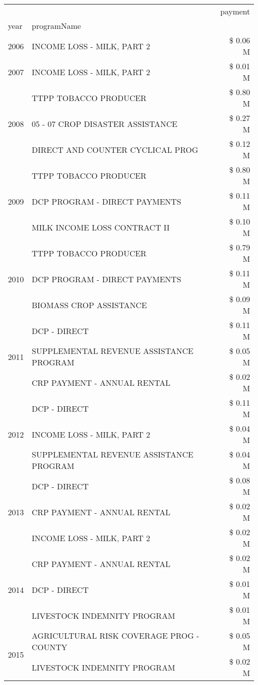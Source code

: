 \begin{tabular}{llr}
\toprule
 &  & payment \\
year & programName &  \\
\midrule
2006 & INCOME LOSS - MILK, PART 2 & \$ 0.06 M \\
\cline{1-3}
2007 & INCOME LOSS - MILK, PART 2 & \$ 0.01 M \\
\cline{1-3}
\multirow[t]{3}{*}{2008} & TTPP TOBACCO PRODUCER & \$ 0.80 M \\
 & 05 - 07 CROP DISASTER ASSISTANCE & \$ 0.27 M \\
 & DIRECT AND COUNTER CYCLICAL PROG & \$ 0.12 M \\
\cline{1-3}
\multirow[t]{3}{*}{2009} & TTPP TOBACCO PRODUCER & \$ 0.80 M \\
 & DCP PROGRAM - DIRECT PAYMENTS & \$ 0.11 M \\
 & MILK INCOME LOSS CONTRACT II & \$ 0.10 M \\
\cline{1-3}
\multirow[t]{3}{*}{2010} & TTPP TOBACCO PRODUCER & \$ 0.79 M \\
 & DCP PROGRAM - DIRECT PAYMENTS & \$ 0.11 M \\
 & BIOMASS CROP ASSISTANCE & \$ 0.09 M \\
\cline{1-3}
\multirow[t]{3}{*}{2011} & DCP - DIRECT & \$ 0.11 M \\
 & SUPPLEMENTAL REVENUE ASSISTANCE PROGRAM & \$ 0.05 M \\
 & CRP PAYMENT - ANNUAL RENTAL & \$ 0.02 M \\
\cline{1-3}
\multirow[t]{3}{*}{2012} & DCP - DIRECT & \$ 0.11 M \\
 & INCOME LOSS - MILK, PART 2 & \$ 0.04 M \\
 & SUPPLEMENTAL REVENUE ASSISTANCE PROGRAM & \$ 0.04 M \\
\cline{1-3}
\multirow[t]{3}{*}{2013} & DCP - DIRECT & \$ 0.08 M \\
 & CRP PAYMENT - ANNUAL RENTAL & \$ 0.02 M \\
 & INCOME LOSS - MILK, PART 2 & \$ 0.02 M \\
\cline{1-3}
\multirow[t]{3}{*}{2014} & CRP PAYMENT - ANNUAL RENTAL & \$ 0.02 M \\
 & DCP - DIRECT & \$ 0.01 M \\
 & LIVESTOCK INDEMNITY PROGRAM & \$ 0.01 M \\
\cline{1-3}
\multirow[t]{3}{*}{2015} & AGRICULTURAL RISK COVERAGE PROG - COUNTY & \$ 0.05 M \\
 & LIVESTOCK INDEMNITY PROGRAM & \$ 0.02 M \\

\end{tabular}
